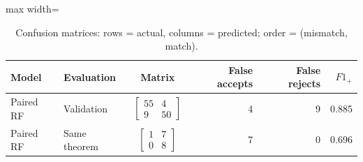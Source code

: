 \begin{table}[htbp]
\centering
\caption{Confusion matrices: rows = actual, columns = predicted; order = (mismatch, match).}
\label{tab:forest-confusion}
\small
\begin{adjustbox}{max width=\textwidth}
\begin{tabular}{llcrrr}
\toprule
Model & Evaluation & Matrix & False accepts & False rejects & $F1_+$ \\
\midrule
Paired RF & Validation & $\left[\begin{array}{rr}55&4\\9&50\end{array}\right]$ & 4 & 9 & 0.885 \\
Paired RF & Same theorem & $\left[\begin{array}{rr}1&7\\0&8\end{array}\right]$ & 7 & 0 & 0.696 \\
\bottomrule
\end{tabular}
\end{adjustbox}
\end{table}
